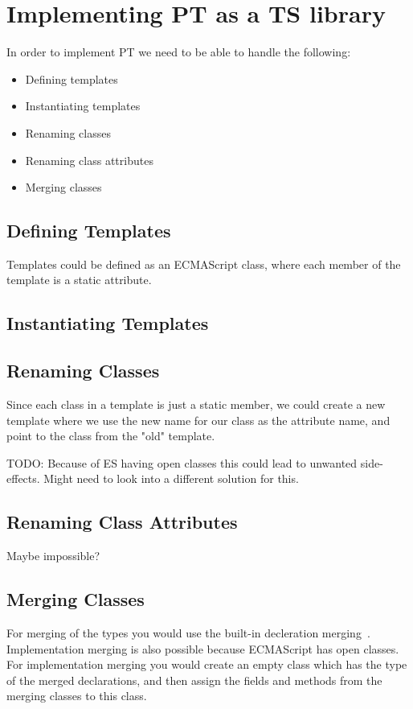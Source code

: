 \section{Implementing PT as a TS library}\label{sec:implementing_pt_as_a_ts_library}

In order to implement PT we need to be able to handle the following:

\begin{itemize}
    \item Defining templates
    \item Instantiating templates
    \item Renaming classes
    \item Renaming class attributes
    \item Merging classes
\end{itemize}

\subsection{Defining Templates}\label{sub:defining_templates}

Templates could be defined as an ECMAScript class, where each member of the template is a static attribute. 

\subsection{Instantiating Templates}\label{sub:instantiating_templates}

\subsection{Renaming Classes}\label{sub:renaming_classes}

Since each class in a template is just a static member, we could create a new template where we use the new name for our class as the attribute name, and point to the class from the "old" template.

TODO: Because of ES having open classes this could lead to unwanted side-effects.
Might need to look into a different solution for this.

\subsection{Renaming Class Attributes}\label{sub:renaming_class_attribtues}

Maybe impossible?

\subsection{Merging Classes}\label{sub:merging_classes}

For merging of the types you would use the built-in decleration merging~\cite{declerationmerging}.
Implementation merging is also possible because ECMAScript has open classes.
For implementation merging you would create an empty class which has the type of the merged declarations, and then assign the fields and methods from the merging classes to this class.





